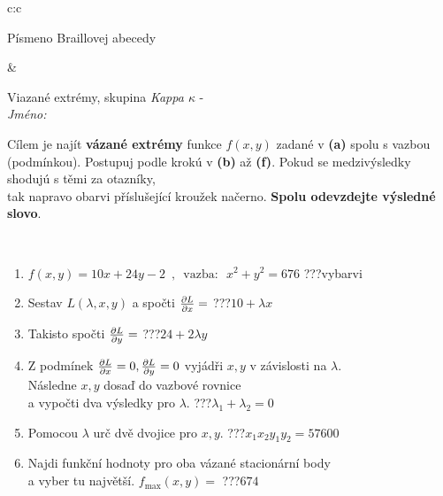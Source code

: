 \documentclass[10pt]{report}
\begin{document}
\begin{tabular}{c:c}
\begin{minipage}[c][104.5mm][t]{0.5\linewidth}
\begin{center}
\begin{minipage}{0.20\linewidth}
\begin{center}
{\small Písmeno Braillovej abecedy}
\end{center}
\end{minipage}
\end{center}
\end{minipage}
&
\begin{minipage}[c][104.5mm][t]{0.5\linewidth}
\begin{center}
\vspace{7mm}
{\huge Viazané extrémy, skupina \textit{Kappa $\kappa$} -}\\[5mm]
\textit{Jméno:}\phantom{xxxxxxxxxxxxxxxxxxxxxxxxxxxxxxxxxxxxxxxxxxxxxxxxxxxxxxxxxxxxxxxxx}\\[5mm]
\begin{minipage}{0.95\linewidth}
\begin{center}
Cílem je najít \textbf{vázané extrémy} funkce $f(x,y)$ zadané v \textbf{(a)} spolu s vazbou (podmínkou). Postupuj podle krokú v \textbf{(b)} až \textbf{(f)}. Pokud se medzivýsledky shodujú s těmi za otazníky,\\tak napravo obarvi příslušející kroužek načerno. \textbf{Spolu odevzdejte výsledné slovo}.
\end{center}
\end{minipage}
\\[1mm]
\begin{minipage}{0.79\linewidth}
\begin{center}
\begin{varwidth}{\linewidth}
\begin{enumerate}
\normalsize
\item $f(x,y)=10x+24y-2 \enspace , \enspace \mathrm{vazba:} \enspace x^2+y^2=676$\quad \dotfill\; ???\;\dotfill \quad vybarvi
\item Sestav $L(\lambda,x,y)$ a spočti $\pdv{L}{x}=$\quad \dotfill\; ???\;\dotfill \quad $10+\lambda x$
\item Takisto spočti $\pdv{L}{y}=$\quad \dotfill\; ???\;\dotfill \quad $24+2\lambda y$
\item Z podmínek $\pdv{L}{x}=0 , \pdv{L}{y}=0$ vyjádři $x,y$ v závislosti na $\lambda$.\\ \phantom{xxxxxx}Následne $x,y$ dosaď do vazbové rovnice\\ \phantom{xxxxxx}a vypočti dva výsledky pro $\lambda$.\quad \dotfill\; ???\;\dotfill \quad $\lambda_1+\lambda_2=0$
\item Pomocou $\lambda$ urč dvě dvojice pro $x,y$.\quad \dotfill\; ???\;\dotfill \quad $x_1 x_2 y_1 y_2=57600$
\item Najdi funkční hodnoty pro oba vázané stacionární body\\ \phantom{xxxxxx}a vyber tu najvětší. $f_{\text{max}}(x,y)=$\quad \dotfill\; ???\;\dotfill \quad $674$

\end{enumerate}
\end{varwidth}
\end{center}
\end{minipage}
\end{center}
\end{minipage}
\end{tabular}
\end{document}
